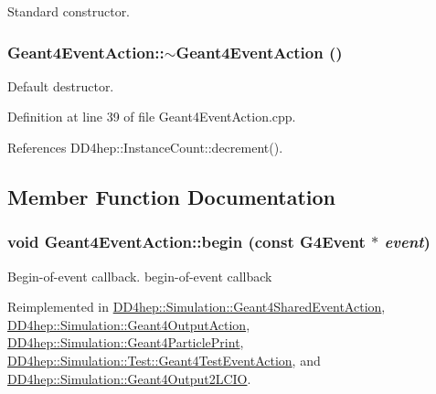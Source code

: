 Standard constructor. \hypertarget{class_d_d4hep_1_1_simulation_1_1_geant4_event_action_aa9e00290e866cfe1f2f471ecdd069291}{
\subsubsection[{$\sim$Geant4EventAction}]{\setlength{\rightskip}{0pt plus 5cm}Geant4EventAction::$\sim$Geant4EventAction ()}}
\label{class_d_d4hep_1_1_simulation_1_1_geant4_event_action_aa9e00290e866cfe1f2f471ecdd069291}


Default destructor. 

Definition at line 39 of file Geant4EventAction.cpp.

References DD4hep::InstanceCount::decrement().

\subsection{Member Function Documentation}
\hypertarget{class_d_d4hep_1_1_simulation_1_1_geant4_event_action_ad10785d157fa962f4ef2a5361bb0f5da}{
\subsubsection[{begin}]{\setlength{\rightskip}{0pt plus 5cm}void Geant4EventAction::begin (const G4Event $\ast$ {\em event})}}
\label{class_d_d4hep_1_1_simulation_1_1_geant4_event_action_ad10785d157fa962f4ef2a5361bb0f5da}


Begin-\/of-\/event callback. begin-\/of-\/event callback 

Reimplemented in \hyperlink{class_d_d4hep_1_1_simulation_1_1_geant4_shared_event_action_a64b5998713b09c32de56774b1d69f64d}{DD4hep::Simulation::Geant4SharedEventAction}, \hyperlink{class_d_d4hep_1_1_simulation_1_1_geant4_output_action_afaad36616c890ac39e80421d340efd47}{DD4hep::Simulation::Geant4OutputAction}, \hyperlink{class_d_d4hep_1_1_simulation_1_1_geant4_particle_print_ad1a3cbd1ef6837aa2bccb3b01c415d8f}{DD4hep::Simulation::Geant4ParticlePrint}, \hyperlink{class_d_d4hep_1_1_simulation_1_1_test_1_1_geant4_test_event_action_a9bce3a0885c7d2d5c6b03756ea3c4e23}{DD4hep::Simulation::Test::Geant4TestEventAction}, and \hyperlink{class_d_d4hep_1_1_simulation_1_1_geant4_output2_l_c_i_o_a36b7ecdf04169c4597bae18e021b60ea}{DD4hep::Simulation::Geant4Output2LCIO}.

